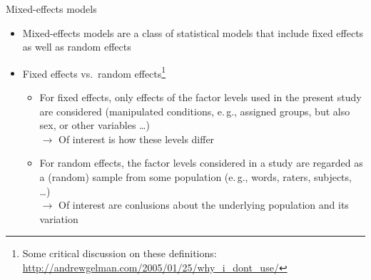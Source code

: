 \documentclass[aspectratio=169]{beamer}
\begin{document}
\begin{frame}{Mixed-effects models}
  \begin{itemize}
    \item Mixed-effects models are a class of statistical models that
      include fixed effects as well as random effects
    \item Fixed effects vs.\ random effects\footnote{Some critical
      discussion on these definitions:
      \url{http://andrewgelman.com/2005/01/25/why_i_dont_use/}}
    \begin{itemize}
      \item For fixed effects, only effects of the factor levels used in the
        present study are considered (manipulated conditions, e.\,g., assigned
        groups, but also sex, or other variables \dots)\\[1ex]

        $\to$ Of interest is how these levels differ\\[1ex]

      \item For random effects, the factor levels considered in a study are
        regarded as a (random) sample from some population (e.\,g., words,
        raters, subjects, \dots)\\[1ex]

        $\to$ Of interest are conlusions about the underlying population and its
        variation
    \end{itemize}
  \end{itemize}
\end{frame}
\end{document}

